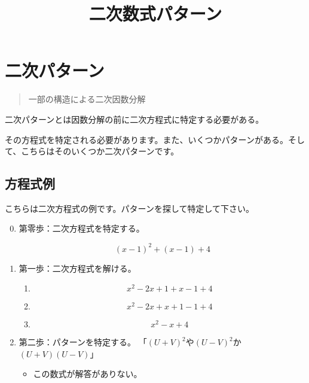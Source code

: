 \documentclass[
]{article}
\title{二次数式パターン}
\author{}
\date{}
\providecommand{\tightlist}{%
  \setlength{\itemsep}{0pt}\setlength{\parskip}{0pt}}
\begin{document}
\maketitle

\hypertarget{ux4e8cux6b21ux30d1ux30bfux30fcux30f3}{%
\section{二次パターン}\label{ux4e8cux6b21ux30d1ux30bfux30fcux30f3}}

\begin{quote}
一部の構造による二次因数分解
\end{quote}

二次パターンとは因数分解の前に二次方程式に特定する必要がある。

その方程式を特定される必要があります。また、いくつかパターンがある。そして、こちらはそのいくつか二次パターンです。

\hypertarget{ux65b9ux7a0bux5f0fux4f8b}{%
\subsection{方程式例}\label{ux65b9ux7a0bux5f0fux4f8b}}

こちらは二次方程式の例です。パターンを探して特定して下さい。

\begin{enumerate}
\setcounter{enumi}{-1}
\tightlist
\item
  第零歩：二次方程式を特定する。

  \[(x - 1)^{2} + (x - 1) + 4\]
\item
  第一歩：二次方程式を解ける。

  \begin{enumerate}
  \item
    \[x^{2} - 2x + 1 + x - 1 + 4\]
  \item
    \[x^{2} - 2x + x + 1 - 1 + 4\]
  \item
    \[x^{2} - x + 4\]
  \end{enumerate}
\item
  第二歩：パターンを特定する。
  「{\((U + V)^{2}\)}や{\((U - V)^{2}\)}か{\((U + V)(U - V)\)}」

  \begin{itemize}
  \tightlist
  \item
    この数式が解答がありない。
  \end{itemize}
\end{enumerate}
\end{document}
